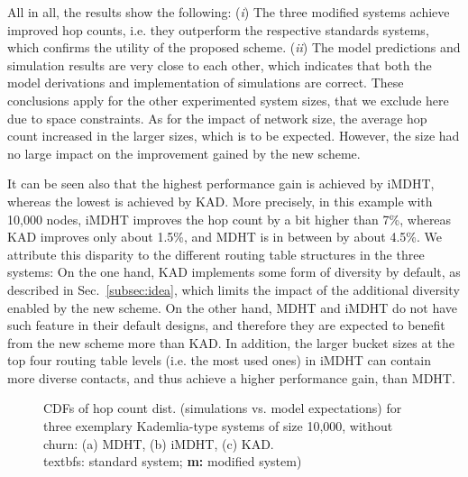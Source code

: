 \documentclass[10pt, conference, compsocconf, letterpaper]{IEEEtran}
\begin{document}
All in all, the results show the following: (\emph{i}) The three modified systems achieve improved hop counts, i.e. they outperform the respective standards systems, which confirms the utility of the proposed scheme. (\emph{ii}) The model predictions and simulation results are very close to each other, which indicates that both the model derivations and implementation of simulations are correct. These conclusions apply for the other experimented system sizes, that we exclude here due to space constraints. As for the impact of network size, the  average hop count increased in the larger sizes, which is to be expected. However,  the size had no large impact on the improvement gained by the new scheme.  

It can be seen also that the highest performance gain is achieved by iMDHT, whereas the lowest is achieved by KAD. More precisely, in this example with 10,000 nodes, iMDHT improves the hop count by a bit higher than 7\%, whereas KAD improves only about 1.5\%, and MDHT is in between by about 4.5\%. We attribute this disparity to the different routing table structures in the three systems: On the one hand, KAD implements some form of diversity by default, as described in Sec.~\ref{subsec:idea}, which limits the impact of the additional diversity enabled by the new scheme. On the other hand, MDHT and iMDHT do not have such feature in their default designs, and therefore they are expected to benefit from the new scheme more than KAD. In addition, the larger bucket sizes at the top four routing table levels (i.e. the most used ones) in iMDHT can contain more diverse contacts, and thus achieve a higher performance gain, than MDHT. 

















\begin{figure*}[ht]
\centering
\captionsetup{font=scriptsize}
\caption{CDFs of hop count dist. (simulations vs. model expectations) for three exemplary Kademlia-type systems of size 10,000, without churn: (a) MDHT, (b) iMDHT, (c) KAD. \\textbf{s:} standard system; \textbf{m:} modified system)}
\label{fig:hop_count_dist}
\end{figure*}
\end{document}

